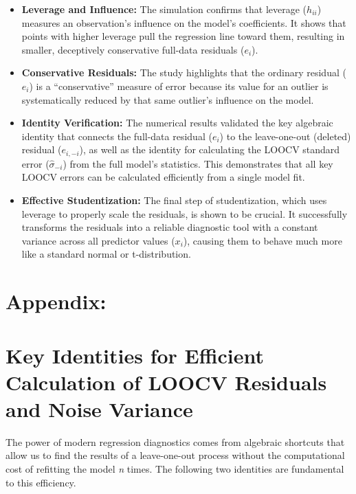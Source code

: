 \documentclass[
]{article}
\begin{document}
\begin{itemize}
\item
  \textbf{Leverage and Influence:} The simulation confirms that leverage
  (\(h_{ii}\)) measures an observation's influence on the model's
  coefficients. It shows that points with higher leverage pull the
  regression line toward them, resulting in smaller, deceptively
  conservative full-data residuals (\(e_i\)).
\item
  \textbf{Conservative Residuals:} The study highlights that the
  ordinary residual (\(e_i\)) is a ``conservative'' measure of error
  because its value for an outlier is systematically reduced by that
  same outlier's influence on the model.
\item
  \textbf{Identity Verification:} The numerical results validated the
  key algebraic identity that connects the full-data residual (\(e_i\))
  to the leave-one-out (deleted) residual (\(e_{i,-i}\)), as well as the
  identity for calculating the LOOCV standard error
  (\(\hat{\sigma}_{-i}\)) from the full model's statistics. This
  demonstrates that all key LOOCV errors can be calculated efficiently
  from a single model fit.
\item
  \textbf{Effective Studentization:} The final step of studentization,
  which uses leverage to properly scale the residuals, is shown to be
  crucial. It successfully transforms the residuals into a reliable
  diagnostic tool with a constant variance across all predictor values
  (\(x_i\)), causing them to behave much more like a standard normal or
  t-distribution.
\end{itemize}

\section*{Appendix:}\label{appendix}

\section{Key Identities for Efficient Calculation of LOOCV Residuals and
Noise
Variance}\label{key-identities-for-efficient-calculation-of-loocv-residuals-and-noise-variance}

The power of modern regression diagnostics comes from algebraic
shortcuts that allow us to find the results of a leave-one-out process
without the computational cost of refitting the model \emph{n} times.
The following two identities are fundamental to this efficiency.
\end{document}
